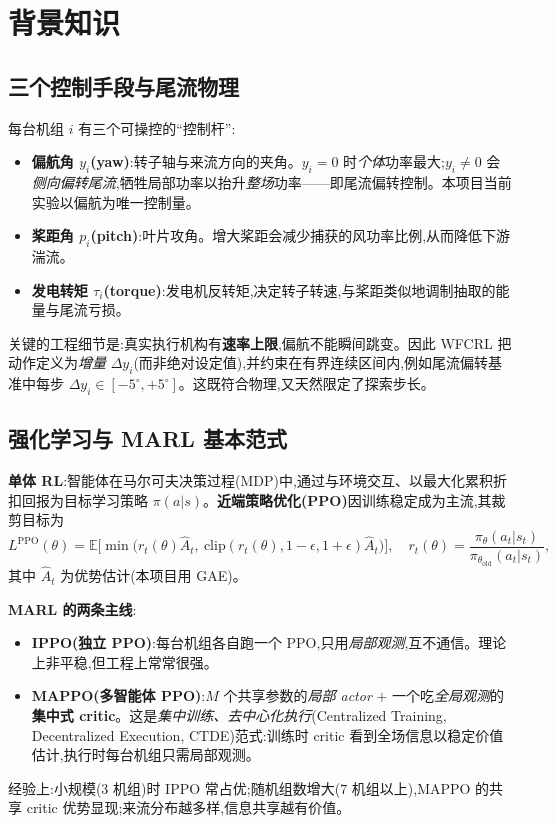\documentclass[12pt,a4paper]{article}
\theoremstyle{definition}
\theoremstyle{plain}
\newcommand{\E}{\mathbb{E}}
\begin{document}
\section{背景知识}

\subsection{三个控制手段与尾流物理}

每台机组 $i$ 有三个可操控的“控制杆”\cite{wfcrl}:
\begin{itemize}[leftmargin=1.5em,itemsep=1pt]
  \item \textbf{偏航角 $y_i$(yaw)}:转子轴与来流方向的夹角。$y_i=0$ 时\emph{个体}功率最大;$y_i\neq0$ 会\emph{侧向偏转尾流},牺牲局部功率以抬升\emph{整场}功率——即尾流偏转控制。本项目当前实验以偏航为唯一控制量。
  \item \textbf{桨距角 $p_i$(pitch)}:叶片攻角。增大桨距会减少捕获的风功率比例,从而降低下游湍流。
  \item \textbf{发电转矩 $\tau_i$(torque)}:发电机反转矩,决定转子转速,与桨距类似地调制抽取的能量与尾流亏损。
\end{itemize}

关键的工程细节是:真实执行机构有\textbf{速率上限},偏航不能瞬间跳变。因此 WFCRL 把动作定义为\emph{增量} $\Delta y_i$(而非绝对设定值),并约束在有界连续区间内,例如尾流偏转基准中每步 $\Delta y_i\in[-5^\circ,+5^\circ]$。这既符合物理,又天然限定了探索步长。

\subsection{强化学习与 MARL 基本范式}

\textbf{单体 RL}:智能体在马尔可夫决策过程(MDP)中,通过与环境交互、以最大化累积折扣回报为目标学习策略 $\pi(a|s)$。\textbf{近端策略优化(PPO)}因训练稳定成为主流,其裁剪目标为
\begin{equation}
  L^{\text{PPO}}(\theta)=\E\!\Big[\min\big(r_t(\theta)\hat A_t,\ \mathrm{clip}(r_t(\theta),1-\epsilon,1+\epsilon)\hat A_t\big)\Big],
  \quad r_t(\theta)=\frac{\pi_\theta(a_t|s_t)}{\pi_{\theta_{\text{old}}}(a_t|s_t)},
\end{equation}
其中 $\hat A_t$ 为优势估计(本项目用 GAE)。

\textbf{MARL 的两条主线}:
\begin{itemize}[leftmargin=1.5em,itemsep=1pt]
  \item \textbf{IPPO(独立 PPO)}:每台机组各自跑一个 PPO,只用\emph{局部观测},互不通信。理论上非平稳,但工程上常常很强。
  \item \textbf{MAPPO(多智能体 PPO)}:$M$ 个共享参数的\emph{局部 actor} $+$ 一个吃\emph{全局观测}的\textbf{集中式 critic}。这是\emph{集中训练、去中心化执行}(Centralized Training, Decentralized Execution, CTDE)范式:训练时 critic 看到全场信息以稳定价值估计,执行时每台机组只需局部观测。
\end{itemize}
经验上\cite{wfcrl}:小规模($3$ 机组)时 IPPO 常占优;随机组数增大($7$ 机组以上),MAPPO 的共享 critic 优势显现;来流分布越多样,信息共享越有价值。
\end{document}
